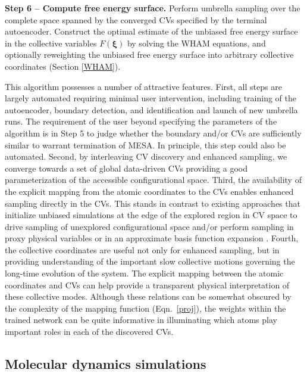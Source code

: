 \documentclass[12pt]{article}
\newcommand*{\blauw}[1]{#1}
\newcommand*{\blauwr}[1]{#1}
\begin{document}
\textbf{Step 6 -- Compute free energy surface.} Perform umbrella sampling over the complete space spanned by the converged CVs specified by the terminal autoencoder. \blauwr{Construct the optimal estimate of the unbiased free energy surface in the collective variables $F(\boldsymbol\xi)$ by solving the WHAM equations, and optionally reweighting the unbiased free energy surface into arbitrary collective coordinates (\blauw{Section \ref{WHAM}}).}

\vspace{0.25in}



This algorithm possesses a number of attractive features. First, all steps are largely automated requiring minimal user intervention, including training of the autoencoder, boundary detection, and identification and launch of new umbrella runs. The requirement of the user beyond specifying the parameters of the algorithm is in \blauw{Step 5} to judge whether the boundary and/or CVs are sufficiently similar to warrant termination of MESA. In principle, this step could also be automated. Second, by interleaving CV discovery and enhanced sampling, we converge towards a set of global data-driven CVs providing a good parameterization of the accessible configurational space. Third, the availability of the explicit mapping from the atomic coordinates to the CVs enables enhanced sampling directly in the CVs. This stands in contrast to existing approaches that initialize unbiased simulations at the edge of the explored region in CV space to drive sampling of unexplored configurational space \cite{chiavazzo2017intrinsic,preto2014fast,zheng2013rapid}  and/or perform sampling in proxy physical variables\cite{ferguson2011integrating} or in an approximate basis function expansion \cite{hashemian2013modeling,li2006version,spiwok2011metadynamics,abrams2012fly,branduardi2007b}. Fourth, the collective coordinates are useful not only for enhanced sampling, but in providing understanding of the important slow collective motions governing the long-time evolution of the system. The explicit mapping between the atomic coordinates and CVs can help provide a transparent physical interpretation of these collective modes. Although these relations can be somewhat obscured by the complexity of the mapping function (\blauw{Eqn.~\ref{proj}}), the weights within the trained network can be quite informative in illuminating which atoms play important roles in each of the discovered CVs.


\subsection{\sffamily \large Molecular dynamics simulations}
\end{document}
